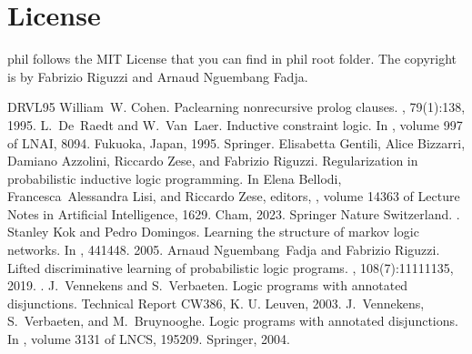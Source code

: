 \documentclass[letterpaper,10pt,english]{sphinxmanual}
\begin{document}
\chapter{License}
\label{\detokenize{index:license}}
\sphinxAtStartPar
phil follows the MIT License that you can find in phil root folder.
The copyright is by Fabrizio Riguzzi and Arnaud Nguembang Fadja.

\begin{sphinxthebibliography}{DRVL95}
\sphinxAtStartPar
William W. Cohen. Pac\sphinxhyphen{}learning non\sphinxhyphen{}recursive prolog clauses. , 79(1):1\textendash{}38, 1995.
\sphinxAtStartPar
L. De Raedt and W. Van Laer. Inductive constraint logic. In , volume 997 of LNAI, 80\textendash{}94. Fukuoka, Japan, 1995. Springer.
\sphinxAtStartPar
Elisabetta Gentili, Alice Bizzarri, Damiano Azzolini, Riccardo Zese, and Fabrizio Riguzzi. Regularization in probabilistic inductive logic programming. In Elena Bellodi, Francesca Alessandra Lisi, and Riccardo Zese, editors, , volume 14363 of Lecture Notes in Artificial Intelligence, 16\textendash{}29. Cham, 2023. Springer Nature Switzerland. .
\sphinxAtStartPar
Stanley Kok and Pedro Domingos. Learning the structure of markov logic networks. In , 441\textendash{}448. 2005.
\sphinxAtStartPar
Arnaud Nguembang Fadja and Fabrizio Riguzzi. Lifted discriminative learning of probabilistic logic programs. , 108(7):1111\textendash{}1135, 2019. .
\sphinxAtStartPar
J. Vennekens and S. Verbaeten. Logic programs with annotated disjunctions. Technical Report CW386, K. U. Leuven, 2003.
\sphinxAtStartPar
J. Vennekens, S. Verbaeten, and M. Bruynooghe. Logic programs with annotated disjunctions. In , volume 3131 of LNCS, 195\textendash{}209. Springer, 2004.
\end{sphinxthebibliography}



\renewcommand{\indexname}{Index}
\printindex
\end{document}
